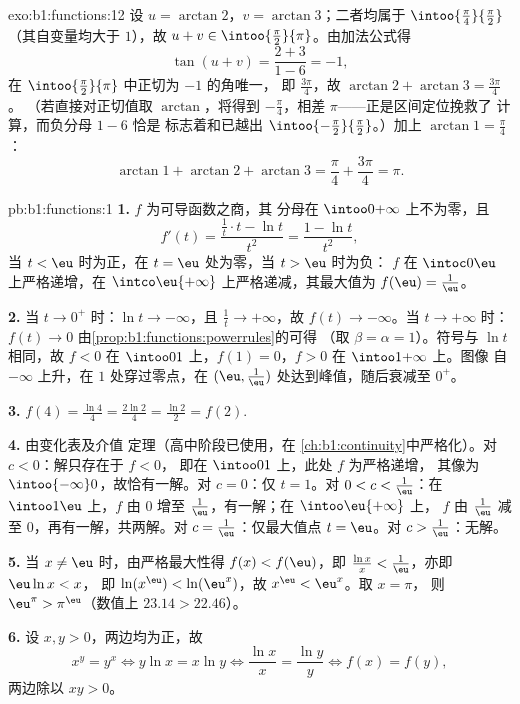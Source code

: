 \begin{solution}{exo:b1:functions:12}
设 $u = \arctan 2$，$v = \arctan 3$；二者均属于
$\intoo{\frac\pi4}{\frac\pi2}$（其自变量均大于 $1$），故 $u
+ v \in \intoo{\frac\pi2}{\pi}$。由加法公式得
\[
\tan(u + v) = \frac{2 + 3}{1 - 6} = -1 ,
\]
在 $\intoo{\frac\pi2}{\pi}$ 中正切为 $-1$ 的角唯一，
即 $\frac{3\pi}4$，故 $\arctan 2 + \arctan 3 = \frac{3\pi}4$。
（若直接对正切值取 $\arctan$，将得到
$-\frac\pi4$，相差 $\pi$——正是区间定位挽救了
计算，而负分母 $1 - 6$ 恰是
标志着和已越出
$\intoo{-\frac\pi2}{\frac\pi2}$。）加上 $\arctan 1 = \frac\pi4$：
\[
\arctan 1 + \arctan 2 + \arctan 3 = \frac\pi4 + \frac{3\pi}4 = \pi .
\]
\end{solution}

\begin{solution}{pb:b1:functions:1}
\textbf{1.} $f$ 为可导函数之商，其
分母在 $\intoo0{+\infty}$ 上不为零，且
\[
f'(t) = \frac{\frac1t \cdot t - \ln t}{t^2} = \frac{1 - \ln
t}{t^2} ,
\]
当 $t < \eu$ 时为正，在 $t = \eu$ 处为零，当 $t > \eu$ 时为负：
$f$ 在 $\intoc0\eu$ 上严格递增，在
$\intco\eu{+\infty}$ 上严格递减，其最大值为 $f(\eu) = \frac1\eu$。

\textbf{2.} 当 $t \to 0^+$ 时：$\ln t \to -\infty$，且 $\frac1t \to
+\infty$，故 $f(t) \to -\infty$。当 $t \to +\infty$ 时：$f(t) \to 0$
由\cref{prop:b1:functions:powerrules}的可得
（取 $\beta = \alpha = 1$）。符号与 $\ln t$ 相同，故 $f < 0$ 在
$\intoo01$ 上，$f(1) = 0$，$f > 0$ 在 $\intoo1{+\infty}$ 上。图像
自 $-\infty$ 上升，在 $1$ 处穿过零点，在 $(\eu,
\frac1\eu)$ 处达到峰值，随后衰减至 $0^+$。

\textbf{3.} $f(4) = \frac{\ln 4}4 = \frac{2\ln 2}4 = \frac{\ln 2}2
= f(2)$.

\textbf{4.} 由变化表及介值
定理（高中阶段已使用，在
\cref{ch:b1:continuity}中严格化）。对 $c < 0$：解只存在于 $f < 0$，
即在 $\intoo01$ 上，此处 $f$ 为严格递增，
其像为 $\intoo{-\infty}0$，故恰有一解。对 $c = 0$：仅
$t = 1$。对 $0 < c < \frac1\eu$：在 $\intoo1\eu$ 上，$f$ 由
$0$ 增至 $\frac1\eu$，有一解；在 $\intoo\eu{+\infty}$ 上，
$f$ 由 $\frac1\eu$ 减至 $0$，再有一解，共两解。对
$c = \frac1\eu$：仅最大值点 $t = \eu$。对 $c >
\frac1\eu$：无解。

\textbf{5.} 当 $x \neq \eu$ 时，由严格最大性得 $f(x) <
f(\eu)$，即 $\frac{\ln x}x < \frac1\eu$，亦即 $\eu\ln x < x$，
即 $\ln(x^\eu) < \ln(\eu^x)$，故 $x^\eu < \eu^x$。取 $x = \pi$，
则 $\eu^\pi > \pi^\eu$（数值上 $23.14 > 22.46$）。

\textbf{6.} 设 $x, y > 0$，两边均为正，故
\[
x^y = y^x \iff y\ln x = x\ln y \iff \frac{\ln x}x = \frac{\ln y}y
\iff f(x) = f(y) ,
\]
两边除以 $xy > 0$。


\end{solution}

